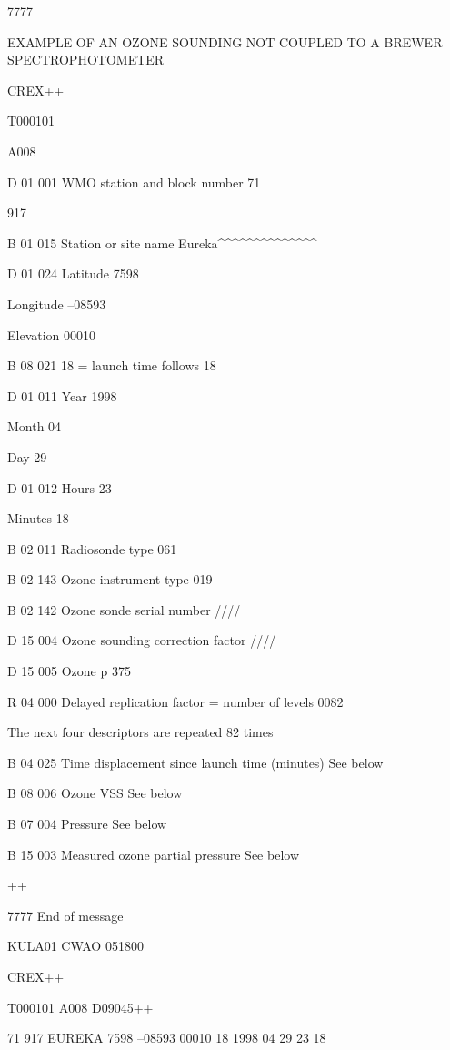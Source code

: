 7777

EXAMPLE OF AN OZONE SOUNDING NOT COUPLED TO A BREWER SPECTROPHOTOMETER

CREX++

T000101

A008

D 01 001 WMO station and block number 71

917

B 01 015 Station or site name Eureka\^{}\^{}\^{}\^{}\^{}\^{}\^{}\^{}\^{}\^{}\^{}\^{}\^{}\^{}

D 01 024 Latitude 7598

Longitude --08593

Elevation 00010

B 08 021 18 = launch time follows 18

D 01 011 Year 1998

Month 04

Day 29

D 01 012 Hours 23

Minutes 18

B 02 011 Radiosonde type 061

B 02 143 Ozone instrument type 019

B 02 142 Ozone sonde serial number ////

D 15 004 Ozone sounding correction factor ////

D 15 005 Ozone p 375

R 04 000 Delayed replication factor = number of levels 0082

The next four descriptors are repeated 82 times

B 04 025 Time displacement since launch time (minutes) See below

B 08 006 Ozone VSS See below

B 07 004 Pressure See below

B 15 003 Measured ozone partial pressure See below

++

7777 End of message

KULA01 CWAO 051800

CREX++

T000101 A008 D09045++

71 917 EUREKA 7598 --08593 00010 18 1998 04 29 23 18

